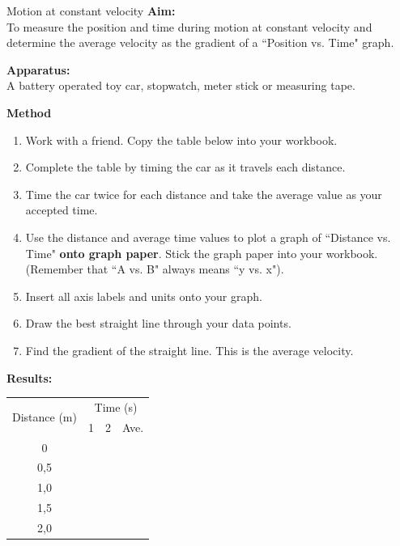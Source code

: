 \begin{g_experiment}{Motion at constant velocity }
            \nopagebreak
\textbf{Aim:}\\
To measure the position and time during motion at constant velocity and determine the average velocity as the gradient of a ``Position vs. Time" graph.\par 
        \label{m38795*id71286}\noindent{}\textbf{Apparatus:}\\
 A battery operated toy car, stopwatch, meter stick or measuring tape.\par 
        \label{m38795*id71301}\noindent{}\textbf{Method}\\
        \label{m38795*id71310}\begin{enumerate}[noitemsep, label=\textbf{\arabic*}. ] 
            \label{m38795*uid101}\item Work with a friend. Copy the table below into your workbook.
\label{m38795*uid102}\item Complete the table by timing the car as it travels each distance.
\label{m38795*uid103}\item Time the car twice for each distance and take the average value as your accepted time.
\label{m38795*uid104}\item Use the distance and average time values to plot a graph of ``Distance vs. Time" \textbf{onto graph paper}. Stick the graph paper into your workbook. (Remember that ``A vs. B" always means ``y vs. x").
\label{m38795*uid105}\item Insert all axis labels and units onto your graph.
\label{m38795*uid106}\item Draw the best straight line through your data points.
\label{m38795*uid107}\item Find the gradient of the straight line. This is the average velocity.
\end{enumerate}
        \par 
        \label{m38795*id71410}\noindent{}\textbf{Results:}
\begin{center}
\begin{tabular}{|c|p{0.5cm}|p{0.5cm}|p{0.5cm}|}\hline
\multirow{2}{*}{Distance (m)}&\multicolumn{3}{c|}{Time (s)}\\\cline{2-4}
&1&2&Ave.\\\hline
0&&&\\\hline
0,5&&&\\\hline
1,0&&&\\\hline
1,5&&&\\\hline
2,0&&&\\\hline

\end{tabular}
\end{center}
\end{g_experiment}
